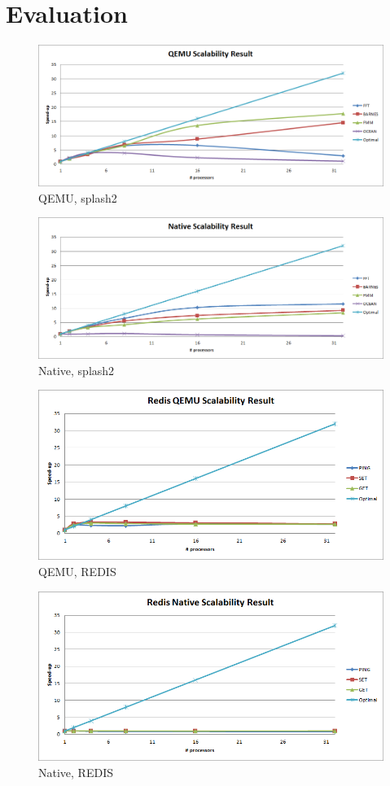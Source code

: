 \section{Evaluation}

\begin{figure}[H]
\center
\includegraphics[width=0.8\linewidth]{figures/qm_splash2.png}
\caption{QEMU, splash2}
\end{figure}

\begin{figure}[H]
\center
\includegraphics[width=0.8\linewidth]{figures/native_splash2.png}
\caption{Native, splash2}
\end{figure}

\begin{figure}[H]
\center
\includegraphics[width=0.8\linewidth]{figures/redis_qemu.png}
\caption{QEMU, REDIS}
\end{figure}

\begin{figure}[H]
\center
\includegraphics[width=0.8\linewidth]{figures/redis_native.png}
\caption{Native, REDIS}
\end{figure}

